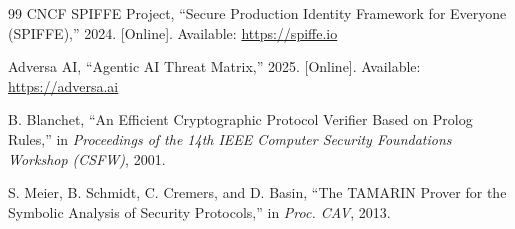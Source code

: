 \documentclass[journal]{IEEEtran}
\begin{document}
\begin{thebibliography}{99}
CNCF SPIFFE Project, ``Secure Production Identity Framework for Everyone (SPIFFE),'' 2024. [Online]. Available: \url{https://spiffe.io}

Adversa AI, ``Agentic AI Threat Matrix,'' 2025. [Online]. Available: \url{https://adversa.ai}

B. Blanchet, ``An Efficient Cryptographic Protocol Verifier Based on Prolog Rules,'' in \textit{Proceedings of the 14th IEEE Computer Security Foundations Workshop (CSFW)}, 2001.

S. Meier, B. Schmidt, C. Cremers, and D. Basin, ``The TAMARIN Prover for the Symbolic Analysis of Security Protocols,'' in \textit{Proc. CAV}, 2013.

\end{thebibliography}
\end{document}

